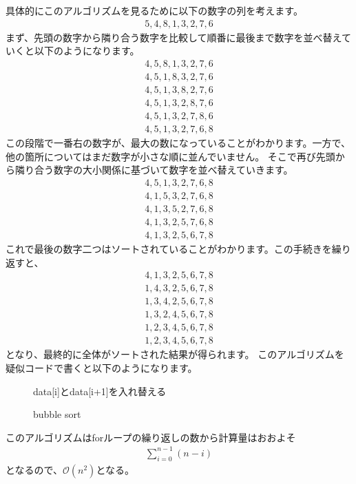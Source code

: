 \documentclass[dvipdfmx,pic,eepic,ecltree]{jarticle}
\begin{document}
具体的にこのアルゴリズムを見るために以下の数字の列を考えます。
\begin{eqnarray}\label{example init}
5, 4, 8, 1, 3, 2, 7, 6
\end{eqnarray}
まず、先頭の数字から隣り合う数字を比較して順番に最後まで数字を並べ替えていくと以下のようになります。
\begin{eqnarray}
4, 5, 8, 1, 3, 2, 7, 6\\
4, 5, 1, 8, 3, 2, 7, 6\\
4, 5, 1, 3, 8, 2, 7, 6\\
4, 5, 1, 3, 2, 8, 7, 6\\
4, 5, 1, 3, 2, 7, 8, 6\\
4, 5, 1, 3, 2, 7, 6, 8
\end{eqnarray}
この段階で一番右の数字が、最大の数になっていることがわかります。一方で、他の箇所についてはまだ数字が小さな順に並んでいません。
そこで再び先頭から隣り合う数字の大小関係に基づいて数字を並べ替えていきます。
\begin{eqnarray}
4, 5, 1, 3, 2, 7, 6, 8\\
4, 1, 5, 3, 2, 7, 6, 8\\
4, 1, 3, 5, 2, 7, 6, 8\\
4, 1, 3, 2, 5, 7, 6, 8\\
4, 1, 3, 2, 5, 6, 7, 8
\end{eqnarray}
これで最後の数字二つはソートされていることがわかります。この手続きを繰り返すと、
\begin{eqnarray}
4, 1, 3, 2, 5, 6, 7, 8\\
1, 4, 3, 2, 5, 6, 7, 8\\
1, 3, 4, 2, 5, 6, 7, 8\\
1, 3, 2, 4, 5, 6, 7, 8\\
1, 2, 3, 4, 5, 6, 7, 8\\
1, 2, 3, 4, 5, 6, 7, 8
\end{eqnarray}
となり、最終的に全体がソートされた結果が得られます。
このアルゴリズムを疑似コードで書くと以下のようになります。
\begin{figure}[H]
\begin{algorithm}[H]
	\caption{bubble sort}
	\label{bubble sort}
	\begin{algorithmic}[1]  
    	\STATE data[i]とdata[i+1]を入れ替える
	\ENDIF
	\ENDFOR
	\ENDFOR
	\end{algorithmic}
\end{algorithm}
\end{figure}
このアルゴリズムはforループの繰り返しの数から計算量はおおよそ
\begin{eqnarray}
\sum_{i=0}^{n-1}(n-i)
\end{eqnarray}
となるので、$\mathcal{O}(n^{2})$となる。
\end{document}
